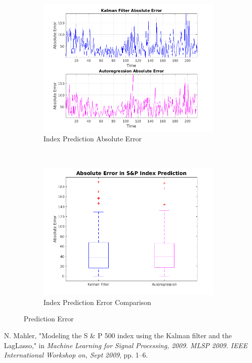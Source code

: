 \documentclass[11pt, fleqn]{article}
\begin{document}
\begin{figure}[!h]
    \centering
    \begin{subfigure}[b]{0.45\textwidth}
        \includegraphics[width=\textwidth]{kalman-autoreg-error.png}
		\caption{Index Prediction Absolute Error}
		\label{fig:kalman-autoreg-error}
    \end{subfigure}
    ~ 
    \begin{subfigure}[b]{0.42\textwidth}
        \includegraphics[width=\textwidth]{kalman-autoreg-error-boxplot.png}
		\caption{Index Prediction Error Comparison}
		\label{fig:kalman-autoreg-error-boxplot}
    \end{subfigure}
    \caption{Prediction Error}
	\label{fig:prediction-error}
\end{figure}



\begin{thebibliography}{9}
N. Mahler, "Modeling the S \& P 500 index using the Kalman filter and the LagLasso," in \textit{Machine Learning for Signal Processing, 2009. MLSP 2009. IEEE International Workshop on, Sept 2009}, pp. 1–6.

\end{thebibliography}
\end{document}
